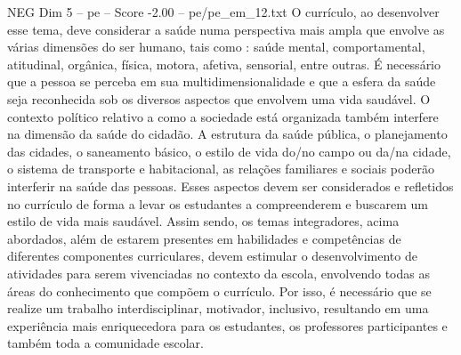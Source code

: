 \begin{textsample}{NEG Dim 5 – pe – Score -2.00 – pe/pe\_em\_12.txt}
O currículo, ao desenvolver esse tema, deve considerar a saúde numa perspectiva mais ampla que envolve as várias dimensões do ser humano, tais como : saúde mental, comportamental, atitudinal, orgânica, física, motora, afetiva, sensorial, entre outras.
É necessário que a pessoa se perceba em sua multidimensionalidade e que a esfera da saúde seja reconhecida sob os diversos aspectos que envolvem uma vida saudável.
O contexto político relativo a como a sociedade está organizada também interfere na dimensão da saúde do cidadão.
A estrutura da saúde pública, o planejamento das cidades, o saneamento básico, o estilo de vida do/no campo ou da/na cidade, o sistema de transporte e habitacional, as relações familiares e sociais poderão interferir na saúde das pessoas.
Esses aspectos devem ser considerados e refletidos no currículo de forma a levar os estudantes a compreenderem e buscarem um estilo de vida mais saudável.
Assim sendo, os temas integradores, acima abordados, além de estarem presentes em habilidades e competências de diferentes componentes curriculares, devem estimular o desenvolvimento de atividades para serem vivenciadas no contexto da escola, envolvendo todas as áreas do conhecimento que compõem o currículo.
Por isso, é necessário que se realize um trabalho interdisciplinar, motivador, inclusivo, resultando em uma experiência mais enriquecedora para os estudantes, os professores participantes e também toda a comunidade escolar.

\end{textsample}
